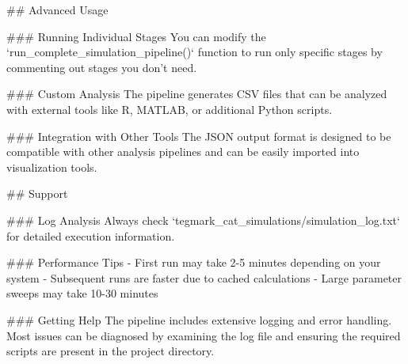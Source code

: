## Advanced Usage

### Running Individual Stages
You can modify the `run_complete_simulation_pipeline()` function to run only specific stages by commenting out stages you don't need.

### Custom Analysis
The pipeline generates CSV files that can be analyzed with external tools like R, MATLAB, or additional Python scripts.

### Integration with Other Tools
The JSON output format is designed to be compatible with other analysis pipelines and can be easily imported into visualization tools.

## Support

### Log Analysis
Always check `tegmark_cat_simulations/simulation_log.txt` for detailed execution information.

### Performance Tips
- First run may take 2-5 minutes depending on your system
- Subsequent runs are faster due to cached calculations
- Large parameter sweeps may take 10-30 minutes

### Getting Help
The pipeline includes extensive logging and error handling. Most issues can be diagnosed by examining the log file and ensuring the required scripts are present in the project directory.